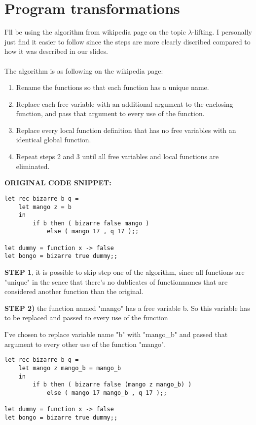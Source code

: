\section{Program transformations}


I'll be using the algorithm from wikipedia page on the topic $\lambda$-lifting.
I personally just find it easier to follow since
the steps are more clearly discribed compared to how it was described in our slides.
\\
\\
The algorithm is as following on the wikipedia page:
\begin{enumerate}
    \item Rename the functions so that each function has a unique name.
    \item Replace each free variable with an additional argument to the enclosing function, and pass that argument to every use of the function.
    \item Replace every local function definition that has no free variables with an identical global function.
    \item Repeat steps 2 and 3 until all free variables and local functions are eliminated.
\end{enumerate}
\newpage


\noindent \textbf{ ORIGINAL CODE SNIPPET:}
\begin{verbatim}
let rec bizarre b q =
    let mango z = b
    in
        if b then ( bizarre false mango )
            else ( mango 17 , q 17 );;

let dummy = function x -> false
let bongo = bizarre true dummy;;
\end{verbatim}

\noindent \textbf{STEP 1}, it is possible to skip step one of the algorithm, since all functions
are "unique" in the sence that there's no dublicates of functionnames that are
considered another function than the original.

\noindent \textbf{STEP 2)} the function named "mango" has a free variable b. So this variable has to be replaced 
and passed to every use of the function

I've chosen to replace variable name "b" with "mango\_b" and passed that argument to every other
use of the function "mango".

\begin{verbatim}
let rec bizarre b q =
    let mango z mango_b = mango_b
    in
        if b then ( bizarre false (mango z mango_b) )
            else ( mango 17 mango_b , q 17 );;

let dummy = function x -> false
let bongo = bizarre true dummy;;
\end{verbatim}

